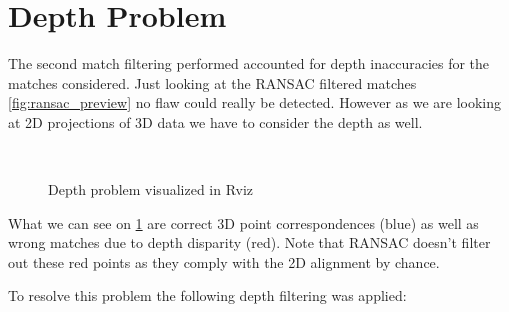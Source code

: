 \section{Depth Problem}{
    The second match filtering performed accounted for depth inaccuracies for the matches considered. Just looking at the RANSAC filtered matches \cref{fig:ransac_preview} no flaw could really be detected. However as we are looking at 2D projections of 3D data we have to consider the depth as well. 

    \begin{figure}[ht]
        \centering
        \\
        \caption{Depth problem visualized in Rviz}
        \label{fig:depth_problem}
    \end{figure}

    What we can see on \cref{fig:depth_problem} are correct 3D point correspondences (blue) as well as wrong matches due to depth disparity (red). Note that RANSAC doesn't filter out these red points as they comply with the 2D alignment by chance.

    To resolve this problem the following depth filtering was applied:
}

